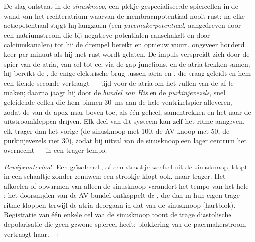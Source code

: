 \begin{proposition}\label{prop:b2:heart:conduction}
De slag ontstaat in de \emph{sinusknoop}, een plekje gespecialiseerde
spiercellen in de wand van het rechteratrium waarvan de membraanpotentiaal
nooit rust: na elke actiepotentiaal stijgt hij langzaam (een
\emph{pacemakerpotentiaal}, aangedreven door een natriumstroom die bij
negatieve potentialen aanschakelt en door calciumkanalen) tot hij de drempel
bereikt en opnieuw vuurt, ongeveer honderd keer per minuut als hij met rust
wordt gelaten. De impuls verspreidt zich door de spier van de atria, van cel
tot cel via de gap junctions, en de atria trekken samen; hij bereikt de
\emph{}, de enige elektrische brug tussen atria en
, die traag geleidt en hem een tiende seconde vertraagt --- tijd
voor de atria om het vullen van de  af te maken; daarna jaagt hij
door de \emph{bundel van His} en de \emph{purkinjevezels}, snel geleidende
cellen die hem binnen \qty{30}{ms} aan de hele ventrikelspier afleveren,
zodat de  van de apex naar boven toe, als één geheel, samentrekken
en het  naar de uitstroomkleppen drijven. Elk deel van dit systeem kan
zelf het ritme aangeven, elk trager dan het vorige (de sinusknoop met 100,
de AV-knoop met 50, de purkinjevezels met 30), zodat bij uitval van de
sinusknoop een lager centrum het overneemt --- in een trager tempo.
\end{proposition}
\begin{proof}[Bewijsmateriaal]
Een geïsoleerd , of een strookje weefsel uit de sinusknoop, klopt in een
schaaltje zonder zenuwen; een strookje  klopt ook, maar trager. Het
afkoelen of opwarmen van alleen de sinusknoop verandert het tempo van het
hele ; het doorsnijden van de AV-bundel ontkoppelt de , die dan
in hun eigen trage ritme kloppen terwijl de atria doorgaan in dat van de
sinusknoop (hartblok). Registratie van één enkele cel van de sinusknoop
toont de trage diastolische depolarisatie die geen gewone spiercel heeft;
blokkering van de pacemakerstroom vertraagt haar.
\end{proof}

